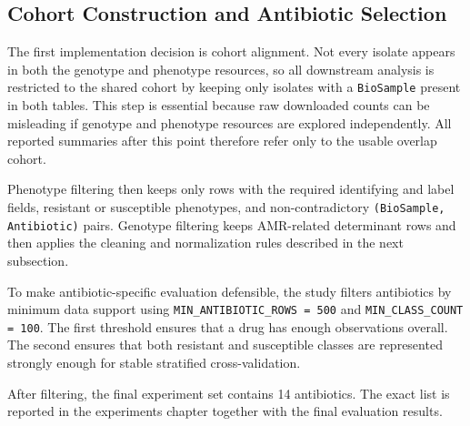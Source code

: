 \subsection{Cohort Construction and Antibiotic Selection}

The first implementation decision is cohort alignment. Not every isolate appears in both the genotype and phenotype resources, so all downstream analysis is restricted to the shared cohort by keeping only isolates with a \texttt{BioSample} present in both tables. This step is essential because raw downloaded counts can be misleading if genotype and phenotype resources are explored independently. All reported summaries after this point therefore refer only to the usable overlap cohort.

Phenotype filtering then keeps only rows with the required identifying and label fields, resistant or susceptible phenotypes, and non-contradictory \texttt{(BioSample, Antibiotic)} pairs. Genotype filtering keeps AMR-related determinant rows and then applies the cleaning and normalization rules described in the next subsection.

To make antibiotic-specific evaluation defensible, the study filters antibiotics by minimum data support using \texttt{MIN\_ANTIBIOTIC\_ROWS = 500} and \texttt{MIN\_CLASS\_COUNT = 100}. The first threshold ensures that a drug has enough observations overall. The second ensures that both resistant and susceptible classes are represented strongly enough for stable stratified cross-validation.

After filtering, the final experiment set contains 14 antibiotics. The exact list is reported in the experiments chapter together with the final evaluation results.
